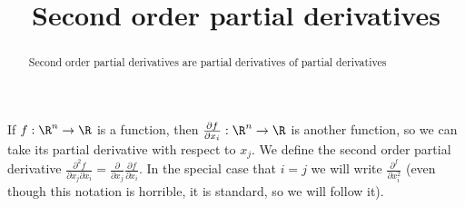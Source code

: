 \documentclass{ximera}
\title{Second order partial derivatives}
\begin{document}
	\begin{abstract}
		Second order partial derivatives are partial derivatives of partial derivatives
	\end{abstract}
	
	\begin{definition}
		If $f:\R^n \to \R$ is a function, then $\frac{\partial f}{\partial x_i}:\R^n \to \R$ is another function, so we can take its partial derivative with respect to $x_j$.
		We define the second order partial derivative $\frac{\partial^2f}{\partial x_j \partial x_i} = \frac{\partial}{\partial x_j} \frac{\partial f}{\partial x_i}$.  In the special case
		that $i=j$ we will write $\frac{\partial^f}{\partial x_i^2}$ (even though this notation is horrible, it is standard, so we will follow it).
	\end{definition}
	
\end{document}
